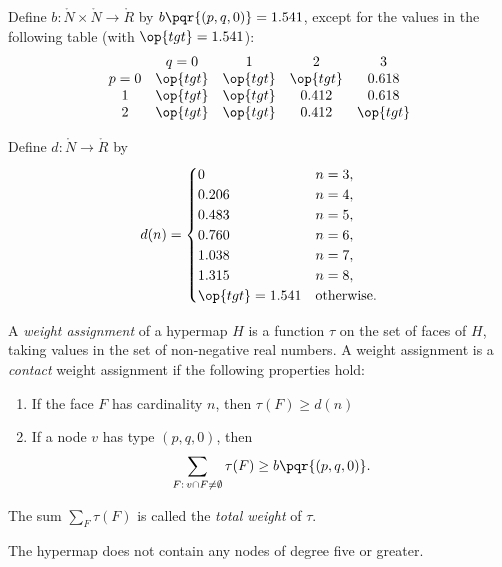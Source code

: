 \begin{definition}[b]
  Define $b:\ring{N}\times \ring{N}\to \ring{R}$ by $b\pqr{(p,q,0)}=1.541$,
  except for the values in the following table
  (with  $\op{tgt}=1.541$):
  {
  \def\tx{\op{tgt}}
  $$\begin{matrix}  &q=0&1&2&3\\
           p=0&\tx&\tx&\tx&0.618\\
           1&\tx&\tx&0.412&0.618\\
           2&\tx&\tx&0.412&\tx\\
    \end{matrix}
   $$
   }
\end{definition}

\begin{definition}[d]
    Define $d:\ring{N}\to \ring{R}$ by
  $$d(n) = \begin{cases}
    0 & n=3, \\
    0.206 & n=4, \\
    0.483 & n=5, \\
    0.760 & n=6, \\
    1.038 & n=7, \\
    1.315 & n=8,\\
    \op{tgt}=1.541 & \text{otherwise}.
  \end{cases}
  $$
\end{definition}

\begin{definition}
%
A {\it weight assignment\/} of a hypermap $H$ is a function $\tau$ on
the set of faces of $H$, taking values in the set of non-negative
real numbers. A weight assignment is a {\it contact} weight assignment if the
following properties hold:
%
\begin{enumerate}
  \item If the face $F$ has cardinality $n$, then
        $\tau(F) \ge d(n)$
  \item If a node $v$ has type $(p,q,0)$, then
        $$\sum_{F:\,v\cap F\ne\emptyset} \tau(F) \ge b{\pqr{(p,q,0)}}.$$
        \label{admissible:b}
        \label{definition:admissible:excess}
\end{enumerate}
The sum $\sum_F \tau(F)$ is called the {\it total weight} of $\tau$.
\end{definition}


\begin{lemma} The hypermap does not contain any nodes of degree five or greater.
\end{lemma}

